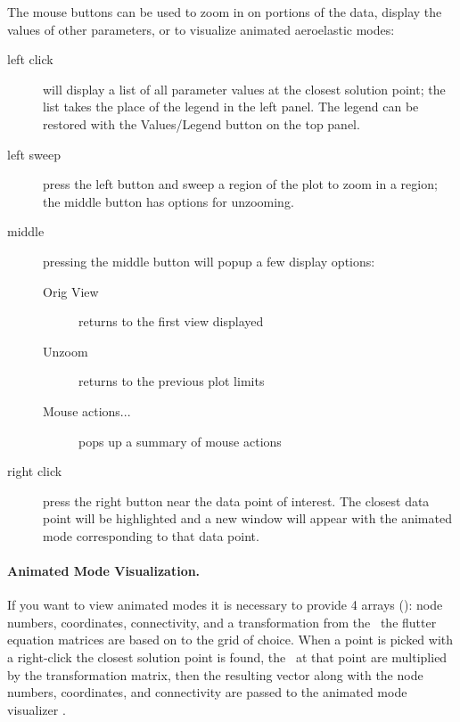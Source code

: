 The mouse buttons can be used to zoom in on portions of the data,
display the values of other parameters,
or to visualize animated aeroelastic modes:
\begin{description}
\item[left click] will display a list of all parameter values at
	the closest solution point; the list takes the place of the legend
	in the left panel. The legend can be restored with the Values/Legend
	button on the top panel.

\item[left sweep] press the left button and sweep a region
of the plot to zoom in a region; the middle button has options for unzooming.
                
\item[middle] pressing the middle button will popup a few display options:
	\begin{description}
		\item[Orig View] returns to the first view displayed
		\item[Unzoom] returns to the previous plot limits
		\item[Mouse actions...] pops up a summary of mouse actions
	\end{description}
\item[right click] press the right button near the
data point of interest. The closest data point will be
highlighted and a new window will appear with the animated mode
corresponding to that data point.
\end{description}

\paragraph{Animated Mode Visualization.}\label{sect:animated-mode}
If you want to view animated modes it is necessary to
provide 4 arrays (): node numbers, coordinates, connectivity, and
a transformation from the \Gc\ the flutter equation matrices are
based on to the grid of choice.
When a point is picked with a right-click the closest solution point
is found, the \Gc\ at that point are multiplied
by the transformation matrix, then the resulting vector along with the
node numbers, coordinates, and connectivity are passed to
the animated mode visualizer .

